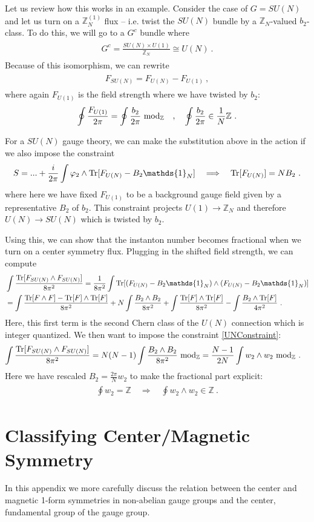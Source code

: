 \documentclass[11pt]{article}
\newcommand{\eq}[1]{\begin{align}\begin{split}#1\end{split}\end{align}}
\def\Tr{{\rm Tr}}
\def\IZ{{\mathbb{Z}}}
\def\IZN{{\mathbb{Z}_N}}
\begin{document}
 
Let us review how this works in an example. Consider the case of $G=SU(N)$ and let us turn on a $\IZ_N^{(1)}$ flux -- i.e. twist the $SU(N)$ bundle by a $\IZ_N$-valued $b_2$-class. To do this, we will go to a $G^c$ bundle where
\eq{
G^c=\frac{SU(N)\times U(1)}{\IZ_N}\cong U(N)~.
}
Because of this isomorphism, we can rewrite
\eq{
F_{SU(N)}=F_{U(N)}-F_{U(1)}~,
}
where again $F_{U(1)}$ is the field strength where we have twisted by $b_2$:
\eq{
\oint\frac{F_{U(1)}}{2\pi}=\oint \frac{b_2}{2\pi}~{\rm mod}_\IZ\quad, \quad \oint \frac{b_2}{2\pi}\in \frac{1}{N}\IZ~. 
}

For a $SU(N)$ gauge theory, we can make the substitution above in the action if we also impose the constraint 
\eq{\label{UNConstraint}
S=...+\frac{i}{2\pi}\int \varphi_2\wedge \Tr[F_{U(N)}-B_2\mathds{1}_N]\quad\Longrightarrow \quad \Tr[F_{U(N)}]=NB_2~.
}
where here we have fixed $F_{U(1)}$ to be a background gauge field given by a representative $B_2$ of $b_2$. This constraint projects $U(1)\to \IZN$ and therefore $U(N)\to SU(N)$ which is twisted by $b_2$. 

Using this, we can show that the instanton number  becomes fractional when we turn on a center symmetry flux. Plugging in the shifted field strength, we can compute
\eq{
&\int\frac{\Tr[F_{SU(N)}\wedge F_{SU(N)}]}{8\pi^2}=\frac{1}{8\pi^2}\int\Tr[(F_{U(N)}-B_2\mathds{1}_N)\wedge (F_{U(N)}-B_2\mathds{1}_N)]\\
&
=\int\frac{\Tr[F\wedge F]-\Tr[F]\wedge \Tr[F]}{8\pi^2}+N\int\frac{B_2\wedge B_2}{8\pi^2}+\int\frac{\Tr[F]\wedge \Tr[F]}{8\pi^2}-\int\frac{B_2\wedge \Tr[F]}{4\pi^2}~.
}
Here, this first term is the second Chern class of the $U(N)$ connection which is integer quantized. We then want to impose the constraint \eqref{UNConstraint}:
\eq{
\int\frac{\Tr[F_{SU(N)}\wedge F_{SU(N)}]}{8\pi^2}&=N(N-1)\int\frac{B_2\wedge B_2}{8\pi^2}~{\rm mod}_\IZ=\frac{N-1}{2N}\int w_2\wedge w_2 ~{\rm mod}_\IZ~. 
}
Here we have rescaled $B_2=\frac{2\pi}{N}w_2$ to make the fractional part explicit: 
\eq{
\oint w_2=\IZ\quad \Longrightarrow \quad \oint w_2\wedge w_2\in \IZ~.
} 
 
 
 \section{Classifying Center/Magnetic  Symmetry}
 \label{app:CenterMag}
 

In this appendix we more carefully discuss the relation between the center and magnetic 1-form symmetries in non-abelian gauge groups and the center, fundamental group of the gauge group. 
\end{document}
